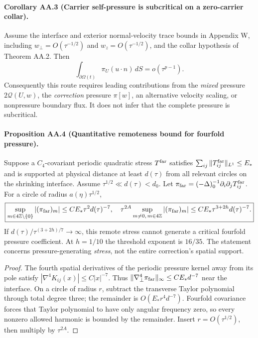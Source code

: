 \paragraph{Corollary AA.3 (Carrier self-pressure is subcritical on a zero-carrier collar).}
Assume the interface and exterior normal-velocity trace bounds in Appendix W, including $w_\perp=O(\tau^{-1/2})$ and $w_z=O(\tau^{-1/2})$, and the collar hypothesis of Theorem AA.2. Then
\begin{equation}\label{eq:AA-carrierwork}
\boxed{\int_{\partial\Omega(t)}\pi_U(u\cdot n)\,dS=o(\tau^{p-1}).}
\end{equation}
Consequently this route requires leading contributions from the \emph{mixed} pressure $2\mathcal Q(U,w)$, the \emph{correction} pressure $\pi[w]$, an alternative velocity scaling, or nonpressure boundary flux. It does not infer that the complete pressure is subcritical.

\paragraph{Proposition AA.4 (Quantitative remoteness bound for fourfold pressure).}
Suppose a $C_4$-covariant periodic quadratic stress $T^{\rm far}$ satisfies $\sum_{ij}\|T_{ij}^{\rm far}\|_{L^1}\le E_*$ and is supported at physical distance at least $d(\tau)$ from all relevant circles on the shrinking interface. Assume $\tau^{1/2}\ll d(\tau)<d_0$. Let $\pi_{\rm far}=(-\Delta)^{-1}_0\partial_i\partial_j T_{ij}^{\rm far}$. For a circle of radius $a(\eta)\tau^{1/2}$,
\begin{equation}\label{eq:AA-remote}
\boxed{\sup_{m\in4\mathbb Z\setminus\{0\}}|(\pi_{\rm far})_m|
\le CE_*\tau^2d(\tau)^{-7},\quad
\tau^{2A}\sup_{m\ne0,\,m\in4\mathbb Z}|(\pi_{\rm far})_m|
\le CE_*\tau^{3+2h}d(\tau)^{-7}.}
\end{equation}
If $d(\tau)/\tau^{(3+2h)/7}\to\infty$, this remote stress cannot generate a critical fourfold pressure coefficient. At $h=1/10$ the threshold exponent is $16/35$. The statement concerns pressure-generating \emph{stress}, not the entire correction's spatial support.
\begin{proof}
The fourth spatial derivatives of the periodic pressure kernel away from its pole satisfy $|\nabla^4K_{ij}(x)|\le C|x|^{-7}$. Thus $\|\nabla_\perp^4\pi_{\rm far}\|_\infty\le CE_*d^{-7}$ near the interface. On a circle of radius $r$, subtract the transverse Taylor polynomial through total degree three; the remainder is $O(E_*r^4d^{-7})$. Fourfold covariance forces that Taylor polynomial to have only angular frequency zero, so every nonzero allowed harmonic is bounded by the remainder. Insert $r=O(\tau^{1/2})$, then multiply by $\tau^{2A}$. \end{proof}

